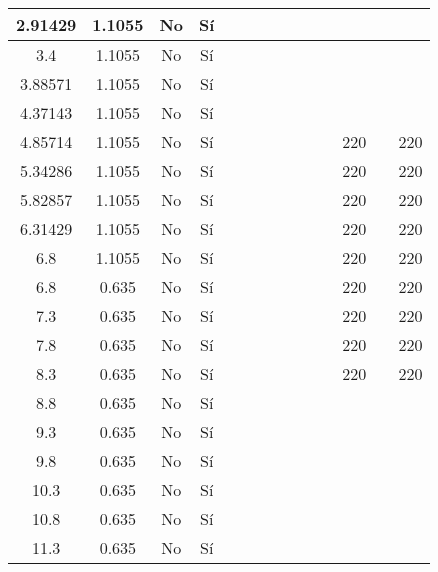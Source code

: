 \begin{table}[H]
{\begin{tabular}{|c|c|c|c|c|c|c|c|c|c|c|c|c|c|}
\hline
2.91429 & 1.1055 & No  & Sí  &     &     &     &     &     &     &     &     &     &  \bigstrut\\
\hline
3.4 & 1.1055 & No  & Sí  &     &     &     &     &     &     &     &     &     &  \bigstrut\\
\hline
3.88571 & 1.1055 & No  & Sí  &     &     &     &     &     &     &     &     &     &  \bigstrut\\
\hline
4.37143 & 1.1055 & No  & Sí  &     &     &     &     &     &     &     &     &     &  \bigstrut\\
\hline
4.85714 & 1.1055 & No  & Sí  &     &     &     &     &     &     &     & 220 &     & 220 \bigstrut\\
\hline
5.34286 & 1.1055 & No  & Sí  &     &     &     &     &     &     &     & 220 &     & 220 \bigstrut\\
\hline
5.82857 & 1.1055 & No  & Sí  &     &     &     &     &     &     &     & 220 &     & 220 \bigstrut\\
\hline
6.31429 & 1.1055 & No  & Sí  &     &     &     &     &     &     &     & 220 &     & 220 \bigstrut\\
\hline
6.8 & 1.1055 & No  & Sí  &     &     &     &     &     &     &     & 220 &     & 220 \bigstrut\\
\hline
6.8 & 0.635 & No  & Sí  &     &     &     &     &     &     &     & 220 &     & 220 \bigstrut\\
\hline
7.3 & 0.635 & No  & Sí  &     &     &     &     &     &     &     & 220 &     & 220 \bigstrut\\
\hline
7.8 & 0.635 & No  & Sí  &     &     &     &     &     &     &     & 220 &     & 220 \bigstrut\\
\hline
8.3 & 0.635 & No  & Sí  &     &     &     &     &     &     &     & 220 &     & 220 \bigstrut\\
\hline
8.8 & 0.635 & No  & Sí  &     &     &     &     &     &     &     &     &     &  \bigstrut\\
\hline
9.3 & 0.635 & No  & Sí  &     &     &     &     &     &     &     &     &     &  \bigstrut\\
\hline
9.8 & 0.635 & No  & Sí  &     &     &     &     &     &     &     &     &     &  \bigstrut\\
\hline
10.3 & 0.635 & No  & Sí  &     &     &     &     &     &     &     &     &     &  \bigstrut\\
\hline
10.8 & 0.635 & No  & Sí  &     &     &     &     &     &     &     &     &     &  \bigstrut\\
\hline
11.3 & 0.635 & No  & Sí  &     &     &     &     &     &     &     &     &     &  \bigstrut\\

\end{tabular}}
\end{table}
